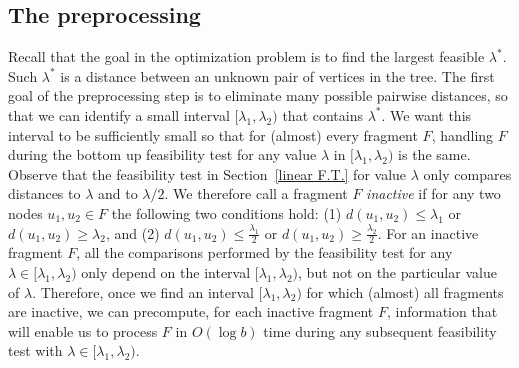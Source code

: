 \documentclass[a4paper,UKenglish]{lipics-v2016}
\theoremstyle{plain}
\begin{document}

\subsection{The preprocessing} \label{Pre-Processing Fragments}

Recall that the goal in the optimization problem is to find the largest feasible $\lambda^{*}$. Such $\lambda^{*}$
is a distance between an unknown pair of vertices in the tree. The first goal of the preprocessing step is to eliminate many possible pairwise distances, so that we can identify a small interval $[\lambda_1,\lambda_2)$ that contains $\lambda^*$. We want this interval to be sufficiently small so that for (almost) every fragment $F$, handling $F$ during the bottom up feasibility test for any value $\lambda$ in $[\lambda_1,\lambda_2)$ is the same. Observe that the feasibility test in Section~\ref{linear F.T.} for value $\lambda$ only compares distances to $\lambda$ and to $\lambda/2$. We therefore call a fragment $F$ \emph{inactive} if for any two nodes $u_1,u_2\in F$ the following two conditions hold: (1) $d(u_{1},u_{2})\leq \lambda_{1}$ or $d(u_{1},u_{2})\geq\lambda_{2}$, and (2) $d(u_{1},u_{2})\leq \frac{\lambda_{1}}{2}$ or $d(u_{1},u_{2})\geq \frac{\lambda_{2}}{2}$. For an inactive fragment $F$, all the comparisons performed by the feasibility test for any $\lambda \in [\lambda_1,\lambda_2)$ only depend on the interval $[\lambda_1,\lambda_2)$, but not on the particular value of $\lambda$. Therefore, once we find an interval $[\lambda_1,\lambda_2)$ for which (almost) all fragments are inactive, we can precompute, for each inactive fragment $F$, information that will enable us to process $F$ in $O(\log b)$ time during any subsequent feasibility test with $\lambda \in [\lambda_1,\lambda_2)$.
\end{document}
